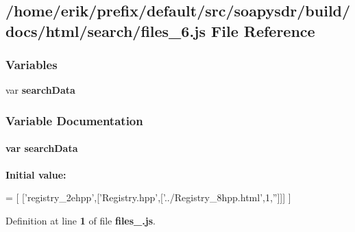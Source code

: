 \subsection{/home/erik/prefix/default/src/soapysdr/build/docs/html/search/files\+\_\+6.js File Reference}
\label{files__6_8js}
\subsubsection*{Variables}
\begin{DoxyCompactItemize}
\item 
var {\bf search\+Data}
\end{DoxyCompactItemize}


\subsubsection{Variable Documentation}
\paragraph[{search\+Data}]{\setlength{\rightskip}{0pt plus 5cm}var search\+Data}\label{files__6_8js_ad01a7523f103d6242ef9b0451861231e}
{\bfseries Initial value\+:}
\begin{DoxyCode}
=
[
  [\textcolor{stringliteral}{'registry\_2ehpp'},[\textcolor{stringliteral}{'Registry.hpp'},[\textcolor{stringliteral}{'../Registry\_8hpp.html'},1,\textcolor{stringliteral}{''}]]]
]
\end{DoxyCode}


Definition at line {\bf 1} of file {\bf files\+\_.\+js}.

